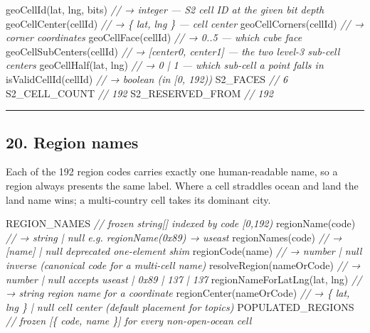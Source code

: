 \documentclass[
  nobib]{tufte-handout}
\newenvironment{Shaded}{}{}
\newcommand{\CommentTok}[1]{\textcolor[rgb]{0.38,0.63,0.69}{\textit{#1}}}
\newcommand{\FunctionTok}[1]{\textcolor[rgb]{0.02,0.16,0.49}{#1}}
\newcommand{\NormalTok}[1]{#1}
\newcommand{\OperatorTok}[1]{\textcolor[rgb]{0.40,0.40,0.40}{#1}}
\begin{document}
\begin{Shaded}
\begin{Highlighting}[]
\FunctionTok{geoCellId}\NormalTok{(lat}\OperatorTok{,}\NormalTok{ lng}\OperatorTok{,}\NormalTok{ bits)   }\CommentTok{// → integer — S2 cell ID at the given bit depth}
\FunctionTok{geoCellCenter}\NormalTok{(cellId)       }\CommentTok{// → \{ lat, lng \} — cell center}
\FunctionTok{geoCellCorners}\NormalTok{(cellId)      }\CommentTok{// → corner coordinates}
\FunctionTok{geoCellFace}\NormalTok{(cellId)         }\CommentTok{// → 0..5 — which cube face}
\FunctionTok{geoCellSubCenters}\NormalTok{(cellId)   }\CommentTok{// → [center0, center1] — the two level{-}3 sub{-}cell centers}
\FunctionTok{geoCellHalf}\NormalTok{(lat}\OperatorTok{,}\NormalTok{ lng)       }\CommentTok{// → 0 | 1 — which sub{-}cell a point falls in}
\FunctionTok{isValidCellId}\NormalTok{(cellId)       }\CommentTok{// → boolean (in [0, 192))}
\NormalTok{S2\_FACES                    }\CommentTok{// 6}
\NormalTok{S2\_CELL\_COUNT               }\CommentTok{// 192}
\NormalTok{S2\_RESERVED\_FROM            }\CommentTok{// 192}
\end{Highlighting}
\end{Shaded}

\begin{center}\rule{0.5\linewidth}{0.5pt}\end{center}

\subsection{20. Region names}\label{region-names}

Each of the 192 region codes carries exactly one human-readable name, so
a region always presents the same label. Where a cell straddles ocean
and land the land name wins; a multi-country cell takes its dominant
city.

\begin{Shaded}
\begin{Highlighting}[]
\NormalTok{REGION\_NAMES                  }\CommentTok{// frozen string[] indexed by code [0,192)}
\FunctionTok{regionName}\NormalTok{(code)              }\CommentTok{// → string | null     e.g. regionName(0x89) → \textquotesingle{}useast\textquotesingle{}}
\FunctionTok{regionNames}\NormalTok{(code)             }\CommentTok{// → [name] | null      deprecated one{-}element shim}
\FunctionTok{regionCode}\NormalTok{(name)              }\CommentTok{// → number | null      inverse (canonical code for a multi{-}cell name)}
\FunctionTok{resolveRegion}\NormalTok{(nameOrCode)     }\CommentTok{// → number | null      accepts \textquotesingle{}useast\textquotesingle{} | \textquotesingle{}0x89\textquotesingle{} | \textquotesingle{}137\textquotesingle{} | 137}
\FunctionTok{regionNameForLatLng}\NormalTok{(lat}\OperatorTok{,}\NormalTok{ lng) }\CommentTok{// → string             region name for a coordinate}
\FunctionTok{regionCenter}\NormalTok{(nameOrCode)      }\CommentTok{// → \{ lat, lng \} | null cell center (default placement for topics)}
\NormalTok{POPULATED\_REGIONS             }\CommentTok{// frozen [\{ code, name \}] for every non{-}open{-}ocean cell}
\end{Highlighting}
\end{Shaded}
\end{document}
